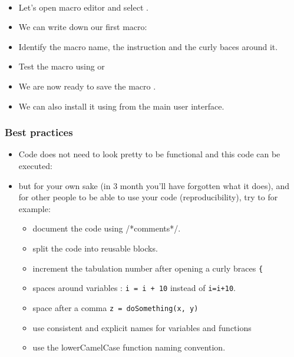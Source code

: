 \begin{frame}[fragile]
  \begin{example}~\par
  \begin{itemize}
  \item Let's open macro editor and select .
  \item We can write down our first macro:\par
    
  \item Identify the macro name, the instruction and the curly baces around it.
  \item Test the macro using  or 
  \item We are now ready to save the macro .
  \item We can also install it using  from the main user interface.
  \end{itemize}
\end{example}
\end{frame}

\begin{frame}[fragile]
  \frametitle<presentation>{Best practices}
  \begin{itemize}
  \item Code does not need to look pretty to be
    functional and this code can be executed:\par
    
  \item but for your own sake (in 3 month you'll have forgotten what it does),
    and for other people to be able to use your code (reproducibility), try to for example:
    \begin{itemize}
      \item document the code using  \textcolor{green!50!black}{/*comments*/}.
      \item split the code into reusable blocks.
      \item increment the tabulation number after opening a curly braces \verb?{?
      \item spaces around variables : \verb?i = i + 10? instead of \verb?i=i+10?.
      \item space after a comma \verb?z = doSomething(x, y)?
      \item use consistent and explicit names for variables and functions
      \item use the lowerCamelCase function naming convention.
    \end{itemize}
  \end{itemize}
\end{frame}

